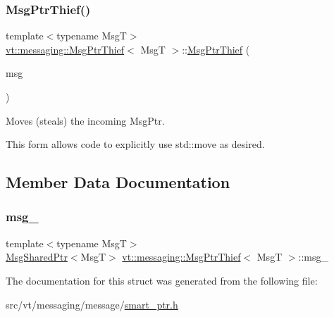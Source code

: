 \subsubsection{\texorpdfstring{Msg\+Ptr\+Thief()}{MsgPtrThief()}\hspace{0.1cm}{\footnotesize\ttfamily [3/3]}}
{\footnotesize\ttfamily template$<$typename MsgT$>$ \\
\hyperlink{structvt_1_1messaging_1_1_msg_ptr_thief}{vt\+::messaging\+::\+Msg\+Ptr\+Thief}$<$ MsgT $>$\+::\hyperlink{structvt_1_1messaging_1_1_msg_ptr_thief}{Msg\+Ptr\+Thief} (\begin{DoxyParamCaption}\item[{\hyperlink{structvt_1_1messaging_1_1_msg_shared_ptr}{Msg\+Shared\+Ptr}$<$ MsgT $>$ \&\&}]{msg }\end{DoxyParamCaption})\hspace{0.3cm}{\ttfamily [inline]}}



Moves (steals) the incoming Msg\+Ptr. 

This form allows code to explicitly use {\ttfamily std\+::move} as desired. 

\subsection{Member Data Documentation}
\mbox{\label{structvt_1_1messaging_1_1_msg_ptr_thief_abc3b141a75ff7a89467d5551384a49ce}} 
\subsubsection{\texorpdfstring{msg\+\_\+}{msg\_}}
{\footnotesize\ttfamily template$<$typename MsgT$>$ \\
\hyperlink{structvt_1_1messaging_1_1_msg_shared_ptr}{Msg\+Shared\+Ptr}$<$MsgT$>$ \hyperlink{structvt_1_1messaging_1_1_msg_ptr_thief}{vt\+::messaging\+::\+Msg\+Ptr\+Thief}$<$ MsgT $>$\+::msg\+\_\+}



The documentation for this struct was generated from the following file\+:\begin{DoxyCompactItemize}
\item 
src/vt/messaging/message/\hyperlink{smart__ptr_8h}{smart\+\_\+ptr.\+h}\end{DoxyCompactItemize}
